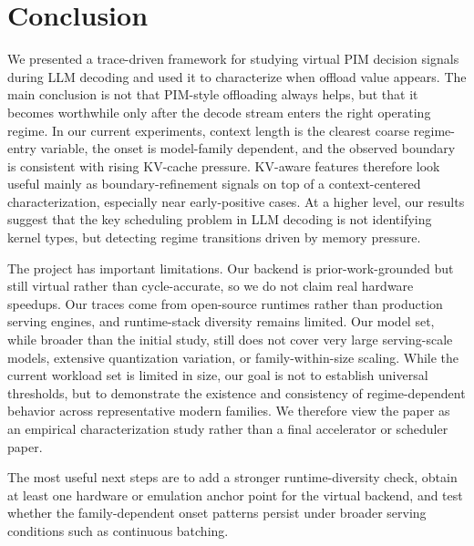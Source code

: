\section{Conclusion}
\label{sec:conclusion}

We presented a trace-driven framework for studying virtual PIM decision signals during LLM decoding and used it to characterize when offload value appears. The main conclusion is not that PIM-style offloading always helps, but that it becomes worthwhile only after the decode stream enters the right operating regime. In our current experiments, context length is the clearest coarse regime-entry variable, the onset is model-family dependent, and the observed boundary is consistent with rising KV-cache pressure. KV-aware features therefore look useful mainly as boundary-refinement signals on top of a context-centered characterization, especially near early-positive cases. At a higher level, our results suggest that the key scheduling problem in LLM decoding is not identifying kernel types, but detecting regime transitions driven by memory pressure.

The project has important limitations. Our backend is prior-work-grounded but still virtual rather than cycle-accurate, so we do not claim real hardware speedups. Our traces come from open-source runtimes rather than production serving engines, and runtime-stack diversity remains limited. Our model set, while broader than the initial study, still does not cover very large serving-scale models, extensive quantization variation, or family-within-size scaling. While the current workload set is limited in size, our goal is not to establish universal thresholds, but to demonstrate the existence and consistency of regime-dependent behavior across representative modern families. We therefore view the paper as an empirical characterization study rather than a final accelerator or scheduler paper.

The most useful next steps are to add a stronger runtime-diversity check, obtain at least one hardware or emulation anchor point for the virtual backend, and test whether the family-dependent onset patterns persist under broader serving conditions such as continuous batching.
